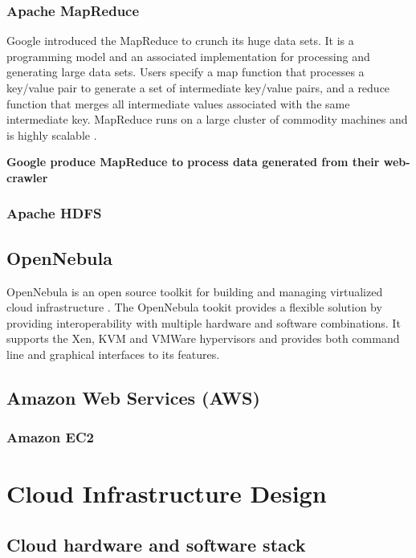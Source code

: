\documentclass[12pt,a4paper]{report}
\begin{document}
\subsection{Apache MapReduce}

Google introduced the MapReduce to crunch its huge data sets. 
It is a programming model and an associated implementation for processing 
and generating large data sets. Users specify a map function that processes a 
key/value pair to generate a set of intermediate key/value pairs, and a reduce 
function that merges all intermediate values associated with the same 
intermediate key. MapReduce runs on a large cluster of commodity machines 
and is highly scalable \cite{dean2008mapreduce}. 

{\bf Google produce MapReduce to process data generated from their web-crawler}

\subsection{Apache HDFS}

\section{OpenNebula}

OpenNebula is an open source toolkit for building and managing virtualized
cloud infrastructure \cite{website:one}. The OpenNebula tookit provides a flexible
solution by providing interoperability with multiple hardware and software combinations.
It supports the Xen, KVM and VMWare hypervisors and provides both command line
and graphical interfaces to its features.


\section{Amazon Web Services (AWS)}

\subsection{Amazon EC2}

\chapter{Cloud Infrastructure Design}

\section{Cloud hardware and software stack}
\end{document}
